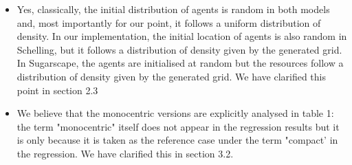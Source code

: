 \documentclass[11pt,a4paper,sans]{moderncv}        %
\begin{document}
\begin{itemize}
	\item Yes, classically, the initial distribution of agents is random in both models and, most importantly for our point, it follows a uniform distribution of density. In our implementation, the initial location of agents is also random in Schelling, but it follows a distribution of density given by the generated grid. In Sugarscape, the agents are initialised at random but the resources follow a distribution of density given by the generated grid. We have clarified this point in section 2.3
           
	\item We believe that the monocentric versions are explicitly analysed in table 1: the term "monocentric" itself does not appear in the regression results but it is only because it is taken as the reference case under the term "compact' in the regression. We have clarified this in section 3.2.
	

\end{itemize}
\end{document}
